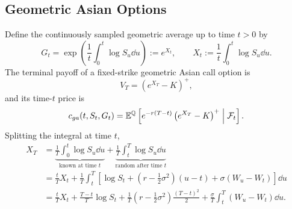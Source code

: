 \subsection{Geometric Asian Options}

Define the continuously sampled geometric average up to time $t > 0$ by
\[
G_t = \exp\left(\frac{1}{t}\int_0^t \log S_u \dd u\right) := e^{X_t}, \qquad X_t := \frac{1}{t}\int_0^t \log S_u \dd u.
\]
The terminal payoff of a fixed-strike geometric Asian call option is
\[
V_T = \left(e^{X_T} - K\right)^+,
\]
and its time-$t$ price is
\[
c_{ga}(t, S_t, G_t) = \mathbb{E}^{\mathbb{Q}}\left[e^{-r(T-t)}\left(e^{X_T} - K\right)^+ \;\middle|\; \mathcal{F}_t\right].
\]
Splitting the integral at time $t$,
\[
\begin{aligned}
    X_T &= \underbrace{\frac{1}{T}\int_0^t \log S_u \dd u}_{\text{known at time } t} + \underbrace{\frac{1}{T}\int_t^T \log S_u \dd u}_{\text{random after time } t} \\
        &= \frac{t}{T} X_t + \frac{1}{T}\int_t^T \left[\log S_t + \left(r - \frac{1}{2}\sigma^2\right)(u - t) + \sigma(W_u - W_t)\right]\dd u \\
        &= \frac{t}{T} X_t + \frac{T - t}{T}\log S_t + \frac{1}{T}\left(r - \frac{1}{2}\sigma^2\right)\frac{(T - t)^2}{2} + \frac{\sigma}{T}\int_t^T (W_u - W_t)\dd u.
\end{aligned}
\]

